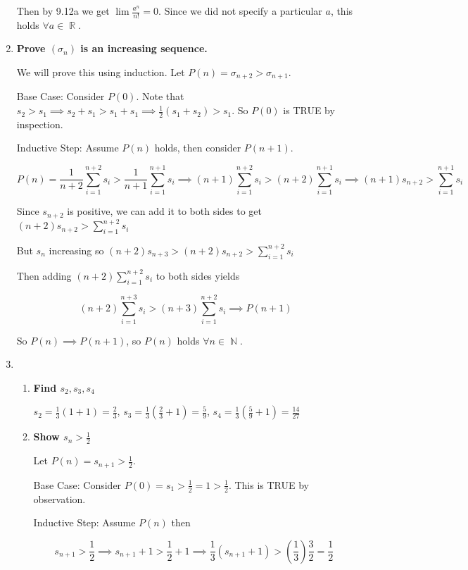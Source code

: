 \documentclass[10pt,a4paper]{article}
\DeclareMathOperator*{\R}{\mathbb{R}}
\DeclareMathOperator*{\N}{\mathbb{N}}
\begin{document}
\begin{enumerate}
        Then by 9.12a we get $\lim \frac{a^n}{n!} = 0$. Since we did not specify a particular $a$, this holds $\forall a \in \R$.

    \item \textbf{Prove $(\sigma_n)$ is an increasing sequence.}

        We will prove this using induction. Let $P(n) = \sigma_{n+2}  > \sigma_{n+1}$.

        Base Case: Consider $P(0)$. Note that $s_2 > s_1 \implies s_2 + s_1 > s_1 + s_1 \implies \frac{1}{2} (s_1+s_2) > s_1$. So $P(0)$ is TRUE by inspection.

        Inductive Step: Assume $P(n)$ holds, then consider $P(n+1)$. 

        $$P(n) =  \frac{1}{n+2} \sum_{i=1}^{n+2} s_i > \frac{1}{n+1} \sum_{i=1}^{n+1} s_i \implies (n+1) \sum_{i=1}^{n+2} s_i > (n+2) \sum_{i=1}^{n+1} s_i \implies (n+1) s_{n+2} > \sum_{i=1}^{n+1} s_i $$

        Since $s_{n+2}$ is positive, we can add it to both sides to get
        $ (n+2) s_{n+2} > \sum_{i=1}^{n+2} s_i $

        But $s_n$ increasing so $ (n+2) s_{n+3} > (n+2) s_{n+2} > \sum_{i=1}^{n+2} s_i $

        Then adding $ (n+2) \sum_{i=1}^{n+2} s_i $ to both sides yields

        $$ (n+2) \sum_{i=1}^{n+3} s_i > (n+3) \sum_{i=1}^{n+2} s_i \implies P(n+1)$$

        So $P(n) \implies P(n+1)$, so $P(n)$ holds $\forall n \in \N$.

    \item \begin{enumerate}
        \item \textbf{Find $s_2, s_3, s_4$}

            $s_2 = \frac{1}{3}(1+1) = \frac{2}{3}$, 
            $s_3 = \frac{1}{3}(\frac{2}{3}+1) = \frac{5}{9}$, 
            $s_4 = \frac{1}{3}(\frac{5}{9}+1) = \frac{14}{27}$

        \item \textbf{Show $s_n > \frac{1}{2}$}

            Let $P(n) = s_{n+1} > \frac{1}{2}$. 

            Base Case: Consider $P(0) = s_{1} > \frac{1}{2} = 1 > \frac{1}{2}$. This is TRUE by observation.

            Inductive Step: Assume $P(n)$ then

            $$s_{n+1} > \frac{1}{2} \implies s_{n+1} + 1 > \frac{1}{2} +1 \implies \frac{1}{3}(s_{n+1}+1) > \left(\frac{1}{3}\right)\frac{3}{2}  = \frac{1}{2}$$


\end{enumerate}
\end{enumerate}
\end{document}
